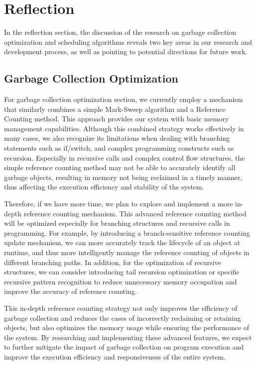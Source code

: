 \documentclass{l4proj}
\begin{document}
\section{Reflection}
In the reflection section, the discussion of the research on garbage collection optimization and scheduling algorithms reveals two key areas in our research and development process, as well as pointing to potential directions for future work.

\subsection{Garbage Collection Optimization}

For garbage collection optimization section, we currently employ a mechanism that similarly combines a simple Mark-Sweep algorithm and a Reference Counting method. This approach provides our system with basic memory management capabilities. Although this combined strategy works effectively in many cases, we also recognize its limitations when dealing with branching statements such as if/switch, and complex programming constructs such as recursion. Especially in recursive calls and complex control flow structures, the simple reference counting method may not be able to accurately identify all garbage objects, resulting in memory not being reclaimed in a timely manner, thus affecting the execution efficiency and stability of the system.

Therefore, if we have more time, we plan to explore and implement a more in-depth reference counting mechanism. This advanced reference counting method will be optimized especially for branching structures and recursive calls in programming. For example, by introducing a branch-sensitive reference counting update mechanism, we can more accurately track the lifecycle of an object at runtime, and thus more intelligently manage the reference counting of objects in different branching paths. In addition, for the optimization of recursive structures, we can consider introducing tail recursion optimization or specific recursive pattern recognition to reduce unnecessary memory occupation and improve the accuracy of reference counting.

This in-depth reference counting strategy not only improves the efficiency of garbage collection and reduces the cases of incorrectly reclaiming or retaining objects, but also optimizes the memory usage while ensuring the performance of the system. By researching and implementing these advanced features, we expect to further mitigate the impact of garbage collection on program execution and improve the execution efficiency and responsiveness of the entire system.
\end{document}
